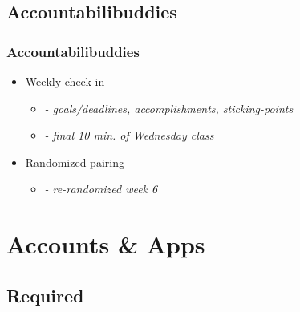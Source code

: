 \documentclass{beamer}
\begin{document}
\subsection{Accountabilibuddies}

\begin{frame}
  \frametitle{Accountabilibuddies}

  \begin{itemize}
    \item Weekly check-in
    \begin{itemize}
      \item[] \emph{- goals/deadlines, accomplishments, sticking-points}
      \item[] \emph{- final 10 min. of Wednesday class}
    \end{itemize}
    \item Randomized pairing
    \begin{itemize}
      \item[] \emph{- re-randomized week 6}
    \end{itemize}
  \end{itemize}

\end{frame}


\section{Accounts \& Apps}




\subsection{Required}
\end{document}
